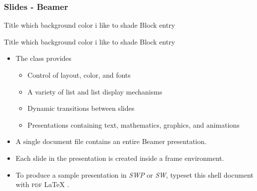 \documentclass[notes=show]{beamer}%
\begin{document}
\begin{frame}%
%

\frametitle{Slides - Beamer}%
%

\begin{block}{Title which background color i like to shade}
Block entry
\end{block}
\begin{myblock}{Title which background color i like to shade}
Block entry
\end{myblock}%


\begin{itemize}
\item The class provides

\begin{itemize}
\item Control of layout, color, and fonts

\item A variety of list and list display mechanisms

\item Dynamic transitions between slides

\item Presentations containing text, mathematics, graphics, and animations
\end{itemize}

\item A single document file contains an entire Beamer presentation.

\item Each slide in the presentation is created inside a frame environment.

\item To produce a sample presentation in \textsl{SWP }or \textsl{SW}, typeset
this shell document with \textsc{pdf}%
\LaTeX{}
.
\end{itemize}%

\end{frame}%
\end{document}

